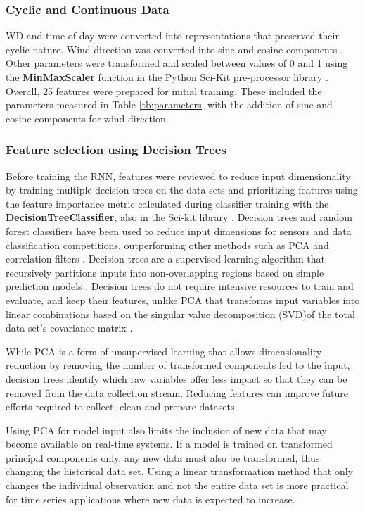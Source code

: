 \subsubsection{Cyclic and Continuous Data}
WD and time of day were converted into representations that preserved their cyclic nature. Wind direction was converted into sine and cosine components \citep{Arhami2013}. Other parameters were transformed and scaled between values of 0 and 1 \citep{Chatterjee2017} using the \textbf{MinMaxScaler} function in the Python Sci-Kit pre-processor library \citep{scikit2011}. Overall, 25 features were prepared for initial training. These included the parameters measured in Table \ref{tb:parameters} with the addition of sine and cosine components for wind direction. 
 
\subsubsection{Feature selection using Decision Trees}
Before training the RNN, features were reviewed to reduce input dimensionality by training multiple decision trees on the data sets and prioritizing features using the feature importance metric calculated during classifier training with the \textbf{DecisionTreeClassifier}, also in the Sci-kit library \citep{scikit2011}. Decision trees and random forest classifiers have been used to reduce input dimensions for sensors \citep{Cho2011} and data classification competitions, outperforming other methods such as PCA and correlation filters \citep{Silipo2014, Al-Alawi2008}. Decision trees are a supervised learning algorithm that recursively partitions inputs into non-overlapping regions based on simple prediction models \citep{Singh2013, Loh2011}.  Decision trees do not require intensive resources to train and evaluate, and keep their features, unlike PCA that transforms input variables into linear combinations based on the singular value decomposition (SVD)of the total data set's covariance matrix \citep{Wang2016}. 

While PCA is a form of unsupervised learning that allows dimensionality reduction by removing the number of transformed components fed to the input, decision trees identify which raw variables offer less impact so that they can be removed from the data collection stream. Reducing features can improve future efforts required to collect, clean and prepare datasets. 

Using PCA for model input also limits the inclusion of new data that may become available on real-time systems. If a model is trained on transformed principal components only, any new data must also be transformed, thus changing the historical data set. Using a linear transformation method that only changes the individual observation and not the entire data set is more practical for time series applications where new data is expected to increase. 

